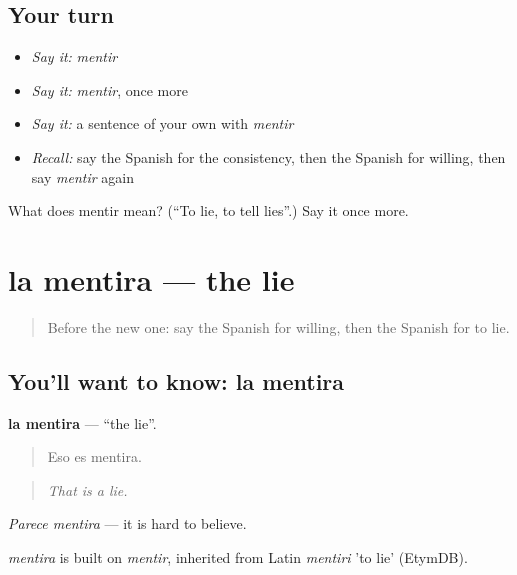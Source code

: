 \subsection*{Your turn}
\begin{itemize}
\raggedright
  \item \emph{Say it:} \emph{mentir}
  \item \emph{Say it:} \emph{mentir}, once more
  \item \emph{Say it:} a sentence of your own with \emph{mentir}
  \item \emph{Recall:} say the Spanish for the consistency, then the Spanish for willing, then say \emph{mentir} again
\end{itemize}

\begin{tcolorbox}[breakable,colback=teal!4,colframe=teal!35!black,title={Before you move on}]
What does mentir mean? (\textquotedblleft{}To lie, to tell lies\textquotedblright{}.) Say it once more.
\end{tcolorbox}
\section[la mentira]{la mentira — the lie}

\label{lesson:ES-C636-mentira}



\begin{quote}
Before the new one: say the Spanish for willing, then the Spanish for to lie.
\end{quote}

\subsection*{You'll want to know: la mentira}
\textbf{la mentira} — \textquotedblleft{}the lie\textquotedblright{}.

\begin{quote}
Eso es mentira.
\end{quote}

\begin{quote}
\emph{That is a lie.}
\end{quote}

\emph{Parece mentira} — it is hard to believe.

\begin{cousinweb}
\emph{mentira} is built on \emph{mentir}, inherited from Latin \emph{mentiri} 'to lie' (EtymDB).
\end{cousinweb}

